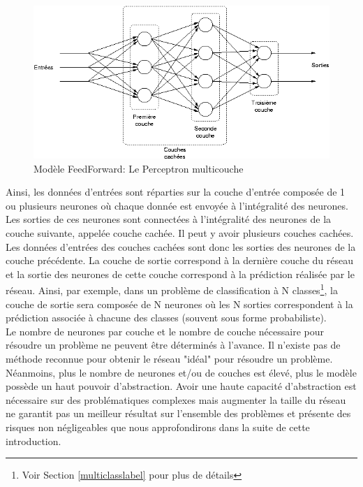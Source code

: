 \begin{figure}
    \centering
    \includegraphics[scale=0.4]{./tex/fondamentaux/multicouche.png}
    \caption{Modèle FeedForward: Le Perceptron multicouche}
    \label{multicouche}
\end{figure}

\noindent Ainsi, les données d'entrées sont réparties sur la couche d'entrée composée de 1 ou plusieurs neurones où chaque donnée est envoyée à l'intégralité des neurones. Les sorties de ces neurones sont connectées à l'intégralité des neurones de la couche suivante, appelée couche cachée. Il peut y avoir plusieurs couches cachées. Les données d'entrées des couches cachées sont donc les sorties des neurones de la couche précédente. La couche de sortie correspond à la dernière couche du réseau et la sortie des neurones de cette couche correspond à la prédiction réalisée par le réseau. Ainsi, par exemple, dans un problème de classification à N classes\footnote{Voir Section \ref{multiclasslabel} pour plus de détails}, la couche de sortie sera composée de N neurones où les N sorties correspondent à la prédiction associée à chacune des classes (souvent sous forme probabiliste).\\

\noindent Le nombre de neurones par couche et le nombre de couche nécessaire pour résoudre un problème ne peuvent être déterminés à l'avance. Il n'existe pas de méthode reconnue pour obtenir le réseau "idéal" pour résoudre un problème. Néanmoins, plus le nombre de neurones et/ou de couches est élevé, plus le modèle possède un haut pouvoir d'abstraction. Avoir une haute capacité d'abstraction est nécessaire sur des problématiques complexes mais augmenter la taille du réseau ne garantit pas un meilleur résultat sur l'ensemble des problèmes et présente des risques non négligeables que nous approfondirons dans la suite de cette introduction.\\

